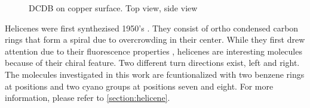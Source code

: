 	\begin{figure}[]
		\centering
		 \quad
		 \quad
		\caption{DCDB on copper surface.  Top view,  side view}
		\label{fig:helicene}
	\end{figure}
	
	Helicenes were first synthezised 1950's \cite{newman_synthesis_1956}. They consist of ortho condensed carbon rings that form a spiral due to overcrowding in their center. While they first drew attention due to their fluorescence properties \cite{vander_donckt_fluorescence_1968}, helicenes are interesting molecules because of their chiral feature. Two different turn directions exist, left and right. The molecules investigated in this work are fcuntionalized with two benzene rings at positions \underline{\qquad} and two cyano groups at positions seven and eight. For more information, please refer to \autoref{section:helicene}.